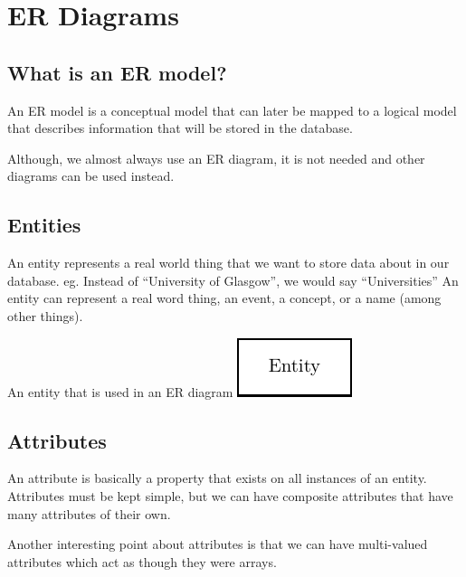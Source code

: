 \section{ER Diagrams}\label{sec:er_diagrams}

\subsection{What is an ER model?}\label{sub:what_is_an_er_model_}

An ER model is a conceptual model that can later be mapped to a logical model that describes information that will be stored in the database.

\begin{note}
    Although, we almost always use an ER diagram, it is not needed and other diagrams can be used instead.
\end{note}

\subsection{Entities}\label{sub:_entities_}

An entity represents a real world thing that we want to store data about in our database. eg. Instead of ``University of Glasgow'', we would say ``Universities''
An entity can represent a real word thing, an event, a concept, or a name (among other things).

\begin{highlight}{An entity that is used in an ER diagram}
    \includegraphics{lualatex/dsr/3/entity.pdf}
\end{highlight}

\subsection{Attributes}\label{sub:attributes}

An attribute is basically a property that exists on all instances of an entity.
Attributes must be kept simple, but we can have composite attributes that have many attributes of their own.

Another interesting point about attributes is that we can have multi-valued attributes which act as though they were arrays.

